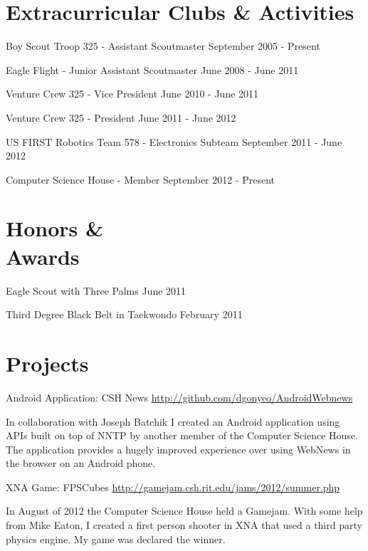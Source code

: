 \documentclass[letterpaper,margin,line,11pt]{resume}
\newcommand{\rurl}[1]{\hfill {\footnotesize \url{#1}}}
\begin{document}
\begin{resume}
\section{\mysidestyle Extracurricular Clubs \& Activities}
	\begin{asparablank}
		\item Boy Scout Troop 325 - {\small Assistant Scoutmaster} \hfill September 2005 - Present
		\item Eagle Flight - {\small Junior Assistant Scoutmaster} \hfill June 2008 - June 2011
		\item Venture Crew 325 - {\small Vice President} \hfill June 2010 - June 2011
		\item Venture Crew 325 - {\small President} \hfill June 2011 - June 2012
		\item US FIRST Robotics Team 578 - {\small Electronics Subteam} \hfill September 2011 - June 2012
		\item Computer Science House - Member \hfill September 2012 - Present
	\end{asparablank}

\section{\mysidestyle Honors \& \\ Awards}
	\begin{asparablank}
		\item Eagle Scout with Three Palms \hfill June 2011
		\item Third Degree Black Belt in Taekwondo \hfill February 2011
	\end{asparablank}

\section{\mysidestyle Projects}
	\begin{compactdesc}
		\item[Android Application: CSH News] \rurl{http://github.com/dgonyeo/AndroidWebnews}
			\item In collaboration with Joseph Batchik I created an Android application using APIs built on top of NNTP by another member of the Computer Science House. The application provides a hugely improved experience over using WebNews in the browser on an Android phone.
                \item[XNA Game: FPSCubes] \rurl{http://gamejam.csh.rit.edu/jams/2012/summer.php}
			\item In August of 2012 the Computer Science House held a Gamejam. With some help from Mike Eaton, I created a first person shooter in XNA that used a third party physics engine. My game was declared the winner.
	\end{compactdesc}
\end{resume}
\end{document}
